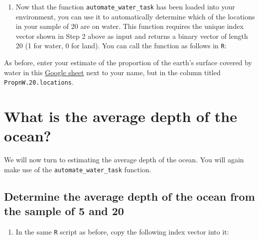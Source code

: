 \documentclass[letterpaper,12pt,twoside,]{pinp}
\providecommand{\tightlist}{%
  \setlength{\itemsep}{0pt}\setlength{\parskip}{0pt}}
\begin{document}
\begin{enumerate}
\def\labelenumi{\arabic{enumi}.}
\setcounter{enumi}{3}
\tightlist
\item
  Now that the function \texttt{automate\_water\_task} has been loaded
  into your environment, you can use it to automatically determine which
  of the locations in your sample of 20 are on water. This function
  requires the unique index vector shown in Step 2 above as input and
  returns a binary vector of length 20 (1 for water, 0 for land). You
  can call the function as follows in \texttt{R}:
\end{enumerate}

\begin{Shaded}
\begin{Highlighting}[]
\StringTok{ }\NormalTok{(}\NormalTok{)}
\end{Highlighting}
\end{Shaded}

As before, enter your estimate of the proportion of the earth's surface
covered by water in this
\href{https://docs.google.com/spreadsheets/d/1Mnxeq9nQcTdQycZ7S_62fYFiNC5_a3fibsyodzfwO58/edit?usp=sharing}{Google
sheet} next to your name, but in the column titled
\texttt{PropnW.20.locations}.

\hypertarget{what-is-the-average-depth-of-the-ocean}{%
\section{What is the average depth of the
ocean?}\label{what-is-the-average-depth-of-the-ocean}}

We will now turn to estimating the average depth of the ocean. You will
again make use of the \texttt{automate\_water\_task} function.

\hypertarget{determine-the-average-depth-of-the-ocean-from-the-sample-of-5-and-20}{%
\subsection{Determine the average depth of the ocean from the sample of
5 and
20}\label{determine-the-average-depth-of-the-ocean-from-the-sample-of-5-and-20}}

\begin{enumerate}
\def\labelenumi{\arabic{enumi}.}
\tightlist
\item
  In the same \texttt{R} script as before, copy the following index
  vector into it:
\end{enumerate}
\end{document}
